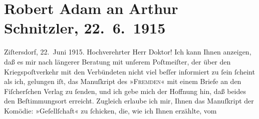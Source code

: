 

         
         \newcommand{\erwaehntePersonen}{Personen:  ?? [Postmeister in Zistersdorf], Alexandre père Dumas}
         \newcommand{\erwaehnteInstitutionen}{Institutionen: S. Fischer Verlag}
         \newcommand{\erwaehnteOrte}{Orte: Volkstheater, Wien, Zistersdorf}
         \newcommand{\erwaehnteWerke}{Werke: Der Fremde, Gesellschaft [Eine Gaunerkomödie]}
               \section[Robert Adam an Arthur Schnitzler, 22. 6. 1915]{ Robert Adam an Arthur Schnitzler, 22. 6. 1915}\nopagebreak{}\rehead{ }\begin{ledgroupsized}[t]{13cm}\normalsize\beginnumbering \toendnotes[C]{\smallbreak\pagebreak[2]} 
\toendnotes[C]{\smallbreak}\pstart
           \raggedleft{}{\pb}Ziſtersdorf, 22. Juni 1915. \pend
           \pstart{}Hochverehrter Herr Doktor!\pend\pstart
           Ich kann Ihnen anzeigen, daß es mir nach längerer Beratung mit unſerem Poſtmeiſter, der über den
                    Kriegspoſtverkehr mit den Verbündeten nicht viel beſſer informiert zu ſein
                    ſcheint als ich, gelungen iſt, das Manuſkript des »\textsc{Fremden}« mit einem Briefe an den Fiſcherſchen
                        Verlag zu ſenden, und ich gebe mich der Hoffnung hin, daß beides den
                    Beſtimmungsort erreicht.\pend
           \pstart
           Zugleich erlaube ich mir, Ihnen das Manuſkript der Komödie: »Geſellſchaft« zu ſchicken, die, wie ich Ihnen erzählte, vom

\end{ledgroupsized}
